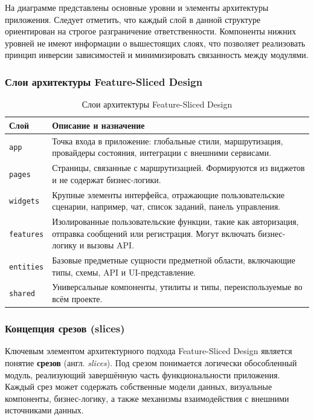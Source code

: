 На диаграмме представлены основные уровни и элементы архитектуры приложения. Следует отметить, что каждый слой в данной структуре ориентирован на строгое разграничение ответственности. Компоненты нижних уровней не имеют информации о вышестоящих слоях, что позволяет реализовать принцип инверсии зависимостей и минимизировать связанность между модулями.

\subsubsection{Слои архитектуры Feature-Sliced Design}

\begin{table}[H]
  \centering
  \caption{Слои архитектуры Feature-Sliced Design}
  \begin{tabular}{|p{3cm}|p{11cm}|}
    \hline
    \textbf{Слой} & \textbf{Описание и назначение} \\ \hline
    \texttt{app}      & Точка входа в приложение: глобальные стили, маршрутизация, провайдеры состояния, интеграции с внешними сервисами. \\ \hline
    \texttt{pages}    & Страницы, связанные с маршрутизацией. Формируются из виджетов и не содержат бизнес-логики. \\ \hline
    \texttt{widgets}  & Крупные элементы интерфейса, отражающие пользовательские сценарии, например, чат, список заданий, панель управления. \\ \hline
    \texttt{features}& Изолированные пользовательские функции, такие как авторизация, отправка сообщений или регистрация. Могут включать бизнес-логику и вызовы API. \\ \hline
    \texttt{entities} & Базовые предметные сущности предметной области, включающие типы, схемы, API и UI-представление. \\ \hline
    \texttt{shared}   & Универсальные компоненты, утилиты и типы, переиспользуемые во всём проекте. \\ \hline
  \end{tabular}
\end{table}

\subsubsection{Концепция срезов (slices)}

Ключевым элементом архитектурного подхода Feature-Sliced Design является понятие \textbf{срезов} (англ. \textit{slices}). Под срезом понимается логически обособленный модуль, реализующий завершённую часть функциональности приложения. Каждый срез может содержать собственные модели данных, визуальные компоненты, бизнес-логику, а также механизмы взаимодействия с внешними источниками данных.

